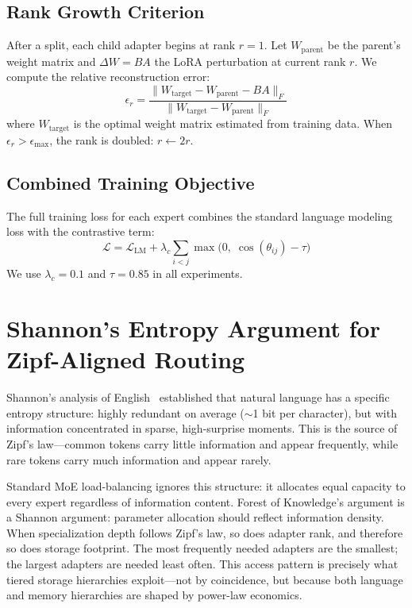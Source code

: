 \documentclass{article}
\newcommand{\tok}{Forest of Knowledge}
\begin{document}
\subsection{Rank Growth Criterion}

After a split, each child adapter begins at rank $r = 1$. Let
$W_{\text{parent}}$ be the parent's weight matrix and $\Delta W = BA$ the LoRA
perturbation at current rank $r$. We compute the relative reconstruction error:
\begin{equation}
    \epsilon_r = \frac{\|W_{\text{target}} - W_{\text{parent}} - BA\|_F}{\|W_{\text{target}} - W_{\text{parent}}\|_F}
\end{equation}
where $W_{\text{target}}$ is the optimal weight matrix estimated from training
data. When $\epsilon_r > \epsilon_{\max}$, the rank is doubled: $r \leftarrow 2r$.

\subsection{Combined Training Objective}

The full training loss for each expert combines the standard language modeling
loss with the contrastive term:
\begin{equation}
    \mathcal{L} = \mathcal{L}_{\text{LM}} + \lambda_c \sum_{i < j} \max\bigl(0,\; \cos(\theta_{ij}) - \tau\bigr)
\end{equation}
We use $\lambda_c = 0.1$ and $\tau = 0.85$ in all experiments.

\section{Shannon's Entropy Argument for Zipf-Aligned Routing}
\label{app:shannon}

Shannon's analysis of English~\cite{shannon1948} established that natural
language has a specific entropy structure: highly redundant on average
($\sim$1 bit per character), but with information concentrated in sparse,
high-surprise moments. This is the source of Zipf's law---common tokens carry
little information and appear frequently, while rare tokens carry much
information and appear rarely.

Standard MoE load-balancing ignores this structure: it allocates equal capacity
to every expert regardless of information content. \tok{}'s argument is a
Shannon argument: parameter allocation should reflect information density. When
specialization depth follows Zipf's law, so does adapter rank, and therefore so
does storage footprint. The most frequently needed adapters are the smallest;
the largest adapters are needed least often. This access pattern is precisely
what tiered storage hierarchies exploit---not by coincidence, but because both
language and memory hierarchies are shaped by power-law economics.
\end{document}
